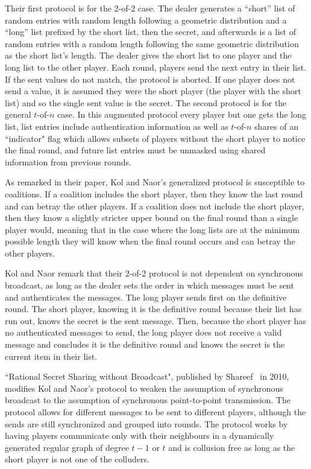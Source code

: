 \documentclass[12pt]{dalcsthesis}
\begin{document}
Their first protocol is for the 2-of-2 case. The dealer generates a ``short'' list of random entries with random length following a geometric distribution and a ``long'' list prefixed by the short list, then the secret, and afterwards is a list of random entries with a random length following the same geometric distribution as the short list's length. The dealer gives the short list to one player and the long list to the other player. Each round, players send the next entry in their list. If the sent values do not match, the protocol is aborted. If one player does not send a value, it is assumed they were the short player (the player with the short list) and so the single sent value is the secret. The second protocol is for the general $t$-of-$n$ case. In this augmented protocol every player but one gets the long list, list entries include authentication information as well as $t$-of-$n$ shares of an ``indicator" flag which allows subsets of players without the short player to notice the final round, and future list entries must be unmasked using shared information from previous rounds.

As remarked in their paper, Kol and Naor's generalized protocol is susceptible to coalitions. If a coalition includes the short player, then they know the last round and can betray the other players. If a coalition does not include the short player, then they know a slightly stricter upper bound on the final round than a single player would, meaning that in the case where the long lists are at the minimum possible length they will know when the final round occurs and can betray the other players.

Kol and Naor remark that their 2-of-2 protocol is not dependent on synchronous broadcast, as long as the dealer sets the order in which messages must be sent and authenticates the messages. The long player sends first on the definitive round. The short player, knowing it is the definitive round because their list has run out, knows the secret is the sent message. Then, because the short player has no authenticated messages to send, the long player does not receive a valid message and concludes it is the definitive round and knows the secret is the current item in their list.

``Rational Secret Sharing without Broadcast", published by Shareef~\cite{Shareef10} in 2010, modifies Kol and Naor's protocol to weaken the assumption of synchronous broadcast to the assumption of synchronous point-to-point transmission. The protocol allows for different messages to be sent to different players, although the sends are still synchronized and grouped into rounds. The protocol works by having players communicate only with their neighbours in a dynamically generated regular graph of degree $t-1$ or $t$ and is collusion free as long as the short player is not one of the colluders.
\end{document}
